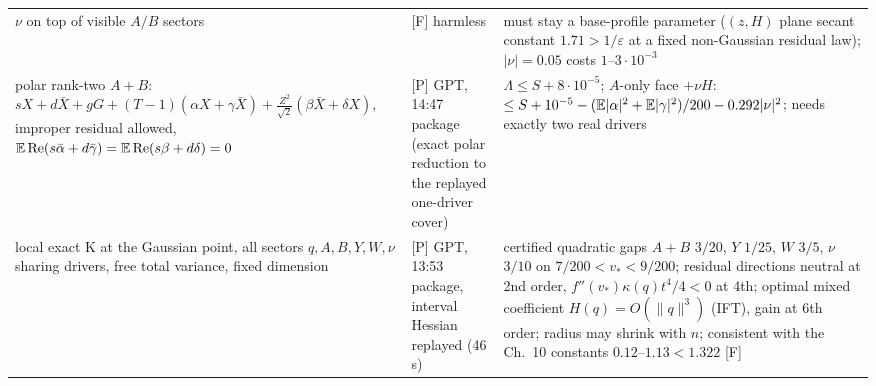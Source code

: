 \documentclass[11pt,a4paper]{article}
\renewcommand{\Re}{\operatorname{Re}}\newcommand{\Var}{\operatorname{Var}}\newcommand{\ph}{\operatorname{phase}}\newcommand{\st}[1]{\textsf{[#1]}}\newcommand{\brkus}{\textunderscore\allowbreak}\usepackage{xstring,adjustbox}\DeclareRobustCommand{\code}[1]{\begingroup\noexpandarg\StrSubstitute{#1}{/}{/\allowbreak}[\brktmp]\texttt{\let\_\brkus\hyphenchar\font=`\-\brktmp}\endgroup}\setlength{\emergencystretch}{3em}
\begin{document}
\begin{center}
\begin{tabular}{p{4.6cm}p{2.2cm}p{8.4cm}}
$\nu$ on top of visible $A/B$ sectors & \st{F} harmless & must stay a base-profile parameter ($(z,H)$ plane secant constant $1.71>1/\varepsilon$ at a fixed non-Gaussian residual law); $|\nu|=0.05$ costs $1$--$3\cdot10^{-3}$\\
polar rank-two $A{+}B$: $sX+d\bar X+gG+(T-1)(\alpha X+\gamma\bar X)+\frac{Z^2}{\sqrt2}(\beta\bar X+\delta X)$, improper residual allowed, $\E\Re(s\bar\alpha+d\bar\gamma)=\E\Re(s\beta+d\delta)=0$ & \st{P} GPT, 14:47 package (exact polar reduction to the replayed one-driver cover) & $\Lambda\le S+8\cdot10^{-5}$; $A$-only face $+\nu H$: $\le S+10^{-5}-(\mathbb{E}|\alpha|^2+\mathbb{E}|\gamma|^2)/200-0.292|\nu|^2$; needs exactly two real drivers\\
local exact K at the Gaussian point, all sectors $q,A,B,Y,W,\nu$ sharing drivers, free total variance, fixed dimension & \st{P} GPT, 13:53 package, interval Hessian replayed (46 s) & certified quadratic gaps $A{+}B$ $3/20$, $Y$ $1/25$, $W$ $3/5$, $\nu$ $3/10$ on $7/200<v_*<9/200$; residual directions neutral at 2nd order, $f''(v_*)\kappa(q)t^4/4<0$ at 4th; optimal mixed coefficient $H(q)=O(\|q\|^3)$ (IFT), gain at 6th order; radius may shrink with $n$; consistent with the Ch.~10 constants $0.12$--$1.13<1.322$ \st{F}\\\bottomrule\end{tabular}\end{center}
\end{document}
